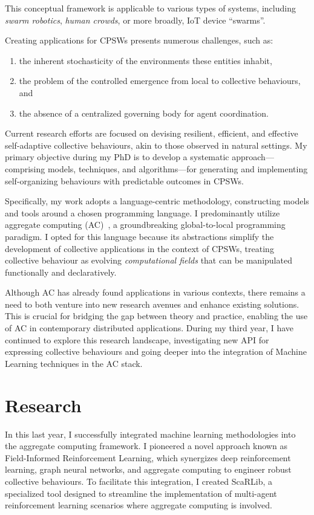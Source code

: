 \documentclass[11pt]{article}
\begin{document}
This conceptual framework is applicable to various types of systems, 
 including \textit{swarm robotics}, \textit{human crowds}, or more broadly, IoT device ``swarms''.

Creating applications for CPSWs presents numerous challenges, such as:
\begin{enumerate}
\item the inherent stochasticity of the environments these entities inhabit,
\item the problem of the controlled emergence from local to collective behaviours, and
\item the absence of a centralized governing body for agent coordination.
\end{enumerate}

Current research efforts are focused on devising resilient, 
 efficient, and effective self-adaptive collective behaviours, 
 akin to those observed in natural settings. 
% 
My primary objective during my PhD is to develop a systematic approach—comprising models, 
 techniques, and algorithms—for generating and implementing self-organizing behaviours with predictable outcomes in CPSWs.

Specifically, my work adopts a language-centric methodology, constructing models and tools around a chosen programming language. I
 predominantly utilize aggregate computing (AC)~\cite{beal2015aggregate}, 
 a groundbreaking global-to-local programming paradigm. 
%
I opted for this language because its abstractions simplify the development of collective applications in the context of CPSWs, treating collective behaviour as evolving \textit{computational fields} that can be manipulated functionally and declaratively.

Although AC has already found applications in various contexts, 
 there remains a need to both venture into new research avenues and enhance existing solutions. 
 This is crucial for bridging the gap between theory and practice, enabling the use of AC in contemporary distributed applications. During my third year, I have continued to explore this research landscape, 
 investigating new API for expressing collective behaviours and going deeper into the integration of Machine Learning techniques in the AC stack.
\section{Research}

In this last year, 
 I successfully integrated machine learning methodologies into the aggregate computing framework. 
 I pioneered a novel approach known as Field-Informed Reinforcement Learning, 
 which synergizes deep reinforcement learning, graph neural networks, and aggregate computing to engineer robust collective behaviours. 
 To facilitate this integration, I created ScaRLib, a specialized tool designed to streamline the implementation of multi-agent reinforcement learning scenarios where aggregate computing is involved.
\end{document}
